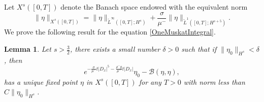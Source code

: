 \documentclass[12pt]{amsart}
\newtheorem{lemma}[theorem]{Lemma}
\theoremstyle{definition}
\numberwithin{equation}{section}
\newcommand{\wt}{\widetilde}
\newcommand{\f}{\frac}
\begin{document}
Let $X^s([0, T])$ denote the Banach space endowed with the equivalent norm
\begin{equation*}
 \|\eta\|_{X^s([0, T])}=\| \eta\|_{\wt L^\infty([0, T]; H^s)}+\f{\sigma}{\mu^-}\| \eta\|_{\wt L^1([0, T]; H^{s+5})}.
\end{equation*}
We prove the following result for the equation \eqref{OneMuskatIntegral}.
\begin{lemma} \label{t:OneMuskatFixed}
Let  $s > \f32$, there exists a small number $\delta>0$ such that if  $\| \eta_0\|_{H^s}<\delta$, then 
\begin{equation*}
    e^{- \f{\sigma}{\mu^-}t|D_x|^5 - \frac{\rho^- g}{\mu^-}t|D_x|} \eta_0 - \mathcal{B}(\eta, \eta),
\end{equation*} 
 has a unique fixed point $\eta$ in $X^s([0, T])$ for any $T>0$ with norm less than $C\| \eta_0\|_{H^s}$.
\end{lemma}
\end{document}
